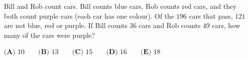 Bill and Rob count cars. Bill counts blue cars, Rob counts red cars, and they both count purple cars (each car has one colour). Of the $196$ cars that pass, $121$ are not blue, red or purple. If Bill counts $36$ cars and Rob counts $49$ cars, how many of the cars were purple?

$\textbf{(A) }10\qquad\textbf{(B) }13\qquad\textbf{(C) }15\qquad\textbf{(D) }16\qquad\textbf{(E) }18$
